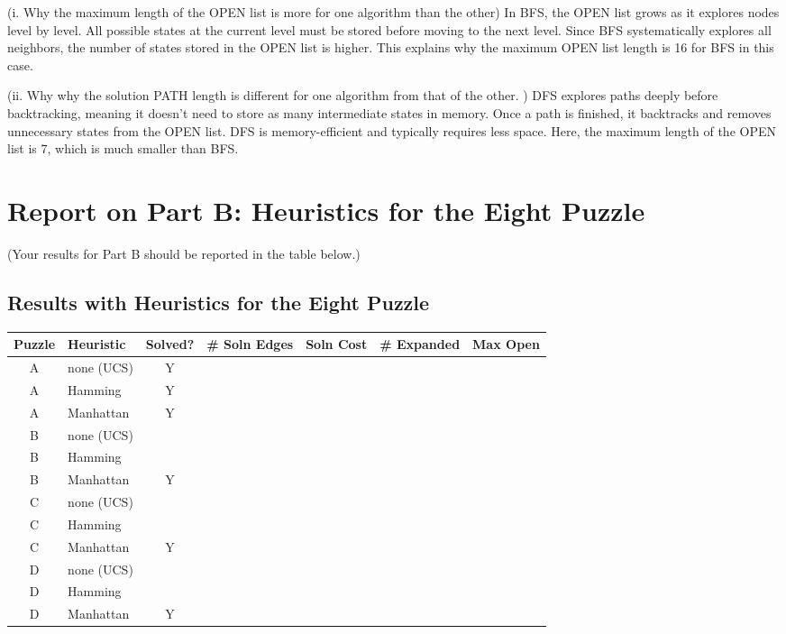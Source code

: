 \documentclass{article}
\begin{document}
\begin{paragraph}
(i. Why the maximum length of the OPEN list is more for one algorithm
than the other)
In BFS, the OPEN list grows as it explores nodes level by level. All possible states at the current level must be stored before moving to the next level.
Since BFS systematically explores all neighbors, the number of states stored in the OPEN list is higher. This explains why the maximum OPEN list length is 16 for BFS in this case.

\end{paragraph}
\begin{paragraph}
(ii. Why why the solution PATH length is different for one algorithm from that of the other. )
DFS explores paths deeply before backtracking, meaning it doesn’t need to store as many intermediate states in memory. Once a path is finished, it backtracks and removes unnecessary states from the OPEN list.
DFS is memory-efficient and typically requires less space. Here, the maximum length of the OPEN list is 7, which is much smaller than BFS.
\end{paragraph}

\newpage
\section{Report on Part B: Heuristics for the Eight Puzzle}

(Your results for Part B should be reported in the table below.)


\subsection{Results with Heuristics for the Eight Puzzle}

{\flushleft
\begin{tabular}{|c|l|c|l|c|c|c|}
\hline
Puzzle & Heuristic & Solved? & \# Soln Edges & Soln Cost & \# Expanded & Max Open\\
\hline
A & none (UCS) & Y & & & & \\
\hline
A & Hamming & Y & & & & \\
\hline
A & Manhattan & Y & & & & \\
\hline
B & none (UCS) & & & & & \\
\hline
B & Hamming &  & & & & \\
\hline
B & Manhattan & Y & & & & \\
\hline
C & none (UCS) & & & & & \\
\hline
C & Hamming &  & & & & \\
\hline
C & Manhattan & Y & & & & \\
\hline
D & none (UCS) & & & & & \\
\hline
D & Hamming &  & & & & \\
\hline
D & Manhattan & Y & & & & \\
\hline

\end{tabular} }
\end{document}
